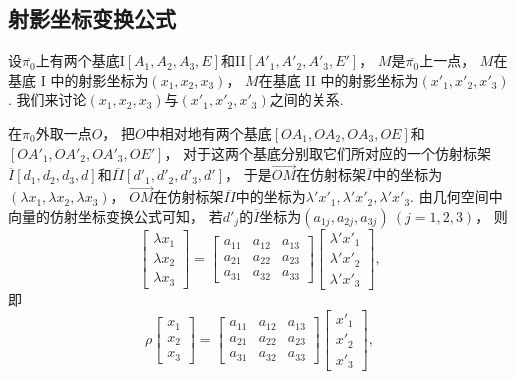 \subsection{射影坐标变换公式}
设\(\overline{\pi_0}\)上有两个基底I\([A_1,A_2,A_3,E]\)和II\([A'_1,A'_2,A'_3,E']\)，
\(M\)是\(\overline{\pi_0}\)上一点，
\(M\)在基底 I 中的射影坐标为\((x_1,x_2,x_3)\)，
\(M\)在基底 II 中的射影坐标为\((x'_1,x'_2,x'_3)\).
我们来讨论\((x_1,x_2,x_3)\)与\((x'_1,x'_2,x'_3)\)之间的关系.

在\(\pi_0\)外取一点\(O\)，
把\(O\)中相对地有两个基底\([OA_1,OA_2,OA_3,OE]\)和\([OA'_1,OA'_2,OA'_3,OE']\)，
对于这两个基底分别取它们所对应的一个仿射标架
\(\overline{I}[d_1,d_2,d_3,d]\)和\(\overline{II}[d'_1,d'_2,d'_3,d']\)，
于是\(\vec{OM}\)在仿射标架\(\overline{I}\)中的坐标为\((\lambda x_1,\lambda x_2,\lambda x_3)\)，
\(\vec{OM}\)在仿射标架\(\overline{II}\)中的坐标为\(\lambda' x'_1,\lambda' x'_2,\lambda' x'_3\).
由几何空间中向量的仿射坐标变换公式可知，
若\(d'_j\)的\(\overline{I}\)坐标为\((a_{1j},a_{2j},a_{3j})\ (j=1,2,3)\)，
则\begin{equation*}
	\begin{bmatrix}
		\lambda x_1 \\ \lambda x_2 \\ \lambda x_3
	\end{bmatrix}
	= \begin{bmatrix}
		a_{11} & a_{12} & a_{13} \\
		a_{21} & a_{22} & a_{23} \\
		a_{31} & a_{32} & a_{33}
	\end{bmatrix}
	\begin{bmatrix}
		\lambda' x'_1 \\ \lambda' x'_2 \\ \lambda' x'_3
	\end{bmatrix},
\end{equation*}
即\begin{equation}\label{equation:解析几何.射影坐标及其变换.射影坐标变换公式}
	\rho \begin{bmatrix}
		x_1 \\ x_2 \\ x_3
	\end{bmatrix}
	= \begin{bmatrix}
		a_{11} & a_{12} & a_{13} \\
		a_{21} & a_{22} & a_{23} \\
		a_{31} & a_{32} & a_{33}
	\end{bmatrix}
	\begin{bmatrix}
		x'_1 \\ x'_2 \\ x'_3
	\end{bmatrix},
\end{equation}
